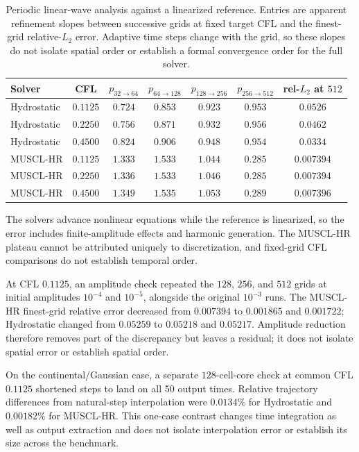 \begin{table}[pos=!htbp]
\centering
\caption{Periodic linear-wave analysis against a linearized reference. Entries are apparent refinement slopes between successive grids at fixed target CFL and the finest-grid relative-$L_2$ error. Adaptive time steps change with the grid, so these slopes do not isolate spatial order or establish a formal convergence order for the full solver.}
\label{tab:app-periodic-linear-convergence}
\scriptsize
\begin{tabular}{lcccccc}
    \toprule
    Solver & CFL & $p_{32\rightarrow64}$ & $p_{64\rightarrow128}$ & $p_{128\rightarrow256}$ & $p_{256\rightarrow512}$ & rel-$L_2$ at $512$ \\
    \midrule
    Hydrostatic & $0.1125$ & $0.724$ & $0.853$ & $0.923$ & $0.953$ & $0.0526$ \\
    Hydrostatic & $0.2250$ & $0.756$ & $0.871$ & $0.932$ & $0.956$ & $0.0462$ \\
    Hydrostatic & $0.4500$ & $0.824$ & $0.906$ & $0.948$ & $0.954$ & $0.0334$ \\
    MUSCL-HR    & $0.1125$ & $1.333$ & $1.533$ & $1.044$ & $0.285$ & $0.007394$ \\
    MUSCL-HR    & $0.2250$ & $1.336$ & $1.533$ & $1.046$ & $0.285$ & $0.007394$ \\
    MUSCL-HR    & $0.4500$ & $1.349$ & $1.535$ & $1.053$ & $0.289$ & $0.007396$ \\
    \bottomrule
\end{tabular}
\end{table}

The solvers advance nonlinear equations while the reference is linearized, so the error includes finite-amplitude effects and harmonic generation. The MUSCL-HR plateau cannot be attributed uniquely to discretization, and fixed-grid CFL comparisons do not establish temporal order.

At CFL $0.1125$, an amplitude check repeated the $128$, $256$, and $512$ grids at initial amplitudes $10 ^ {-4}$ and $10 ^ {-5}$, alongside the original $10 ^ {-3}$ runs. The MUSCL-HR finest-grid relative error decreased from $0.007394$ to $0.001865$ and $0.001722$; Hydrostatic changed from $0.05259$ to $0.05218$ and $0.05217$. Amplitude reduction therefore removes part of the discrepancy but leaves a residual; it does not isolate spatial error or establish spatial order.

On the continental/Gaussian case, a separate $128$-cell-core check at common CFL $0.1125$ shortened steps to land on all 50 output times. Relative trajectory differences from natural-step interpolation were $0.0134\%$ for Hydrostatic and $0.00182\%$ for MUSCL-HR. This one-case contrast changes time integration as well as output extraction and does not isolate interpolation error or establish its size across the benchmark.

